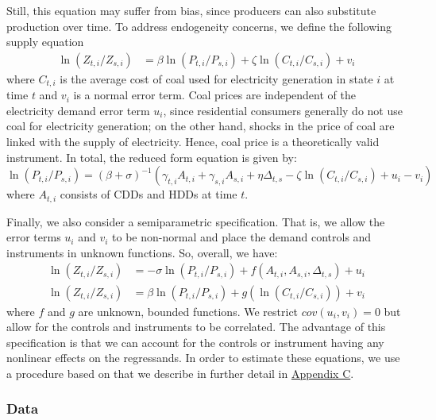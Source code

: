 \documentclass[11pt,a4paper,leqno]{extarticle}
\begin{document}
	Still, this equation may suffer from bias, since producers can also substitute production over time. To address endogeneity concerns, we define the following supply equation
	\begin{align}
	\ln (Z_{ t, i} / Z_{ s, i}) &= \beta \ln (P_{t,i} / P_{s,i}) + \zeta \ln (C_{t,i} / C_{s,i}) + v_{i}
	\end{align}
	where $C_{t,i}$ is the average cost of coal used for electricity generation in state $i$ at time $t$ and $v_i$ is a normal error term. Coal prices are independent of the electricity demand error term $u_i$, since residential consumers generally do not  use coal for electricity generation; on the other hand, shocks in the price of coal are linked with the supply of electricity. Hence, coal price is a theoretically valid instrument.  In total, the reduced form equation is given by:
	\begin{equation}
	\ln (P_{t,i} / P_{s,i}) = \left( \beta + \sigma \right)^{-1} \left( \gamma_{t,i} A_{t,i} + \gamma_{s,i} A_{s,i} + \eta \Delta_{t,s} - \zeta \ln (C_{t,i} / C_{s,i}) + u_{i} - v_i \right)  
	\end{equation}
	where $A_{t,i}$ consists of CDDs and HDDs at time $t$. 
	
	Finally, we also consider a semiparametric specification. That is, we allow the error terms $u_i$ and $v_i$ to be non-normal and place the demand controls and instruments in unknown functions. So, overall, we have:
	\begin{align} \label{eq:pariv1}
	\ln (Z_{ t, i} / Z_{ s, i}) &= -\sigma \ln (P_{t,i} / P_{s,i}) +  f \left( A_{t,i}, A_{s,i}, \Delta_{t,s} \right) + u_i \\
	\ln (Z_{ t, i} / Z_{ s, i}) &= \beta \ln (P_{t,i} / P_{s,i}) + g \left( \ln (C_{t,i} / C_{s,i})  \right) + v_{i} \label{eq:pariv2}
	\end{align}
	where $f$ and $g$ are unknown, bounded functions. We restrict $cov(u_i, v_i) = 0$ but allow for the controls and instruments to be correlated. The advantage of this specification is that we can account for the controls or instrument having any nonlinear effects on the regressands. In order to estimate these equations, we use a procedure based on \citet{Newey} that we describe in further detail in \hyperref[sec:AppendixC]{Appendix C}.  \noindent
	
	\noindent
	\subsubsection{Data}
	
\end{document}
